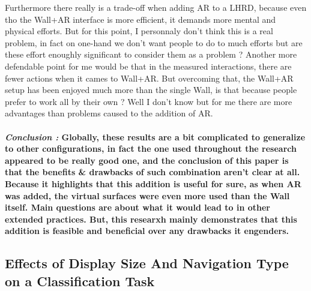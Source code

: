 \documentclass{article}
\begin{document}
{                \newline
                \indent \indent \textnormal{Furthermore there really is a trade-off when adding AR to a LHRD, because even tho the Wall+AR interface is more efficient, it demands more mental and physical efforts. But for this point, I personnaly
                don't think this is a real problem, in fact on one-hand we don't want people to do to much efforts but are these effort enoughly significant to consider them as a problem ? Another more defendable point for me 
                would be that in the measured interactions, there are fewer actions when it cames to Wall+AR. But overcoming that, the Wall+AR setup has been enjoyed much more than the single Wall, is that because people prefer to work all by their
                own ? Well I don't know but for me there are more advantages than problems caused to the addition of AR.} }

    \paragraph{ \textit{Conclusion :}
                \newline 
                \indent \indent \textnormal{Globally, these results are a bit complicated to generalize to other configurations, in fact the one used throughout the research appeared to be 
                really good one, and the conclusion of this paper is that the benefits \& drawbacks of such combination aren't clear at all. Because it highlights that this addition is useful for sure, as when AR was added, the virtual 
                surfaces were even more used than the Wall itself. Main questions are about what it would lead to in other extended practices.}
                \newline 
                \indent \indent \textnormal{But, this researxh mainly demonstrates that this addition is feasible and beneficial over any drawbacks it engenders.}}


    \subsection{Effects of Display Size And Navigation Type on a Classification Task}
\end{document}
